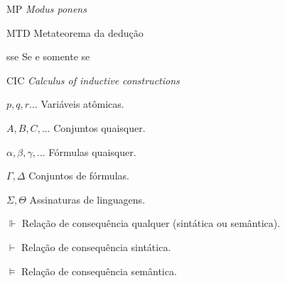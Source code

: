 



\listoftables*
\cleardoublepage

\begin{siglas}
	\item[MP] \textit{Modus ponens}
	\item[MTD] Metateorema da dedução
	\item[sse] Se e somente se
	\item[CIC] \textit{Calculus of inductive constructions}
\end{siglas}

\begin{simbolos}
    \item [$p, q, r\ldots$] Variáveis atômicas.
    \item [$A, B, C, \ldots$] Conjuntos quaisquer.
    \item [$\alpha, \beta, \gamma, \ldots$] Fórmulas quaisquer.
    \item [$\Gamma, \Delta$] Conjuntos de fórmulas.
    \item [$\Sigma, \Theta$] Assinaturas de linguagens.
    \item[$\Vdash$] Relação de consequência qualquer (sintática ou semântica).
    \item[$\vdash$] Relação de consequência sintática.
    \item[$\vDash$] Relação de consequência semântica.
\end{simbolos}


